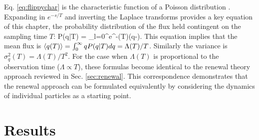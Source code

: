 Eq. \ref{eq:flippychar} is the characteristic function of a Poisson distribution \citep{Cox1965}.
Expanding in $e^{-s/T}$ and inverting the Laplace transforms provides a key equation of this chapter, the probability distribution of the flux held contingent on the sampling time $T$:
\be P(q|T) = \sum_{l=0}^\infty {}e^{-\Lambda(T)}\delta(q-). \label{eq:flippydist}\ee
This equation implies that the mean flux is $\langle q(T) \rangle = \int_0^\infty q P(q|T) dq = \Lambda(T)/T$. Similarly the variance is $\sigma_q^2(T) = \Lambda(T)/T^2$. For the case when $\Lambda(T)$ is proportional to the observation time ($\Lambda \propto T$), these formulas become identical to the renewal theory approach reviewed in Sec. \ref{sec:renewal}.
This correspondence demonstrates that the renewal approach can be formulated equivalently by considering the dynamics of individual particles as a starting point.

\section{Results \label{sec:res}}
